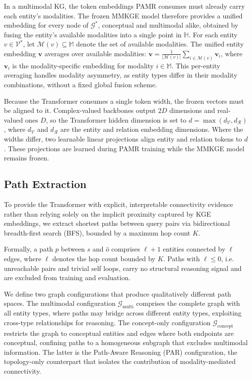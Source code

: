 \documentclass[runningheads]{llncs}
\begin{document}
In a multimodal KG, the token embeddings PAMR consumes must already
carry each entity's modalities. The frozen MMKGE model therefore provides
a unified embedding for every node of $\mathcal{G}^*$, conceptual and
multimodal alike, obtained by fusing the entity's available modalities
into a single point in $\mathbb{H}$.  For each entity $v \in
\mathcal{V}^*$, let
$\mathcal{M}(v) \subseteq \mathbb{M}$ denote the set of available
modalities.  The unified entity embedding $\mathbf{v}$ averages over
available modalities:
$\mathbf{v} = \frac{1}{|\mathcal{M}(v)|} \sum_{i \in \mathcal{M}(v)} \mathbf{v}_i$,
where $\mathbf{v}_i$ is the modality-specific embedding for modality
$i \in \mathbb{M}$.  This per-entity averaging handles modality
asymmetry, as entity types differ in their modality combinations,
without a fixed global fusion scheme.

Because the Transformer consumes a single token width, the frozen vectors
must be aligned to it. Complex-valued backbones
output $2D$ dimensions and real-valued ones $D$, so the Transformer
hidden dimension is set to $d = \max(d_{\mathcal{V}},
d_{\mathcal{R}})$, where $d_{\mathcal{V}}$ and $d_{\mathcal{R}}$ are the
entity and relation embedding dimensions. Where the widths differ, two
learnable linear projections align entity and relation tokens to $d$.
These projections are learned during PAMR training while the MMKGE model
remains frozen.

\subsection{Path Extraction}
\label{sec:path-extraction}

To provide the Transformer with explicit, interpretable connectivity evidence rather than
relying solely on the implicit proximity captured by KGE embeddings, we extract shortest
paths between query pairs via bidirectional breadth-first search (BFS), bounded by a
maximum hop count $K$.

Formally, a path $p$ between $s$ and $\hat{o}$ comprises $\ell + 1$
entities connected by $\ell$ edges, where
$\ell$ denotes the hop count bounded by $K$.
Paths with $\ell \leq 0$, i.e. unreachable pairs and trivial self loops,
carry no structural reasoning signal and are excluded from training and
evaluation.

We define two graph configurations that produce qualitatively different path spaces.
The multimodal configuration $\mathcal{G}_{\text{multi}}$ comprises the complete
graph with all entity types, where paths may bridge across different entity types,
exploiting cross-type relationships for reasoning.  The concept-only configuration
$\mathcal{G}_{\text{concept}}$ restricts the graph to conceptual entities and
edges where both endpoints are conceptual, confining paths to a homogeneous
subgraph that excludes multimodal information.  The latter is the
Path-Aware Reasoning (PAR) configuration, the topology-only counterpart
that isolates the contribution of modality-mediated connectivity.
\end{document}
